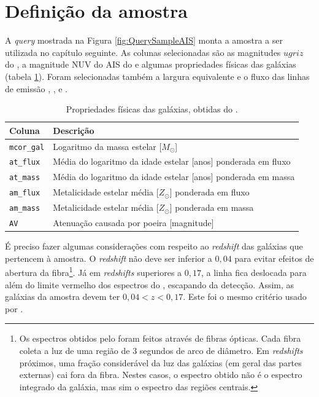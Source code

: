 
\section{Definição da amostra \STARLIGHTUV}
\label{sec:Crossmatch:DefAmostras:StarlightUV}

A {\em query} mostrada na Figura \ref{fig:QuerySampleAIS} monta a amostra a ser
utilizada no capítulo seguinte. As colunas selecionadas são as magnitudes
$ugriz$ do \SDSS, a magnitude NUV do AIS do \galex e algumas propriedades
físicas das galáxias (tabela \ref{tab:ParamFisicos}). Foram selecionadas também
a largura equivalente e o fluxo das linhas de emissão \Halpha, \Hbeta, \OIII e
\NII.

\begin{table}
	\caption[Propriedades físicas das galáxias utilizados na amostra.]
	{Propriedades físicas das galáxias, obtidas do \starlight.}
	\begin{tabular}{l l}
		Coluna & Descrição \\
		\midrule
		\texttt{mcor\_gal} &
		Logaritmo da massa estelar [$M_{\odot}$]
		\\
		\texttt{at\_flux} &
		Média do logaritmo da idade estelar [anos] ponderada em
		fluxo
		\\
		\texttt{at\_mass} &
		Média do logaritmo da idade estelar [anos] ponderada em
		massa
		 \\
		 \texttt{am\_flux} &
		 Metalicidade estelar média [$Z_{\odot}$] ponderada em fluxo
		 \\
		\texttt{am\_mass} &
		Metalicidade estelar média [$Z_{\odot}$] ponderada em massa
		\\
		\texttt{AV} &
		Atenuação causada por poeira [magnitude]
		\\
	\end{tabular}
	\label{tab:ParamFisicos}
\end{table}

É preciso fazer algumas  considerações com respeito ao {\em redshift} das
galáxias que pertencem à amostra. O {\em redshift} não deve ser inferior a
$0,04$ para evitar efeitos de abertura da fibra\footnote{Os espectros obtidos
pelo \SDSS foram feitos através de fibras ópticas. Cada fibra coleta a luz de
uma região de 3 segundos de arco de diâmetro. Em {\em redshifts} próximos, uma
fração considerável da luz das galáxias (em geral das partes externas) cai fora
da fibra. Nestes casos, o espectro obtido não é o espectro integrado da galáxia,
mas sim o espectro das regiões centrais.}. Já em {\em redshifts} superiores a
$0,17$, a linha \NII fica deslocada para além do limite vermelho dos espectros
do \SDSS, escapando da detecção. Assim, as galáxias da amostra devem ter $0,04 <
z < 0,17$. Este foi o mesmo critério usado por \citet{CidFernandes2011}.

